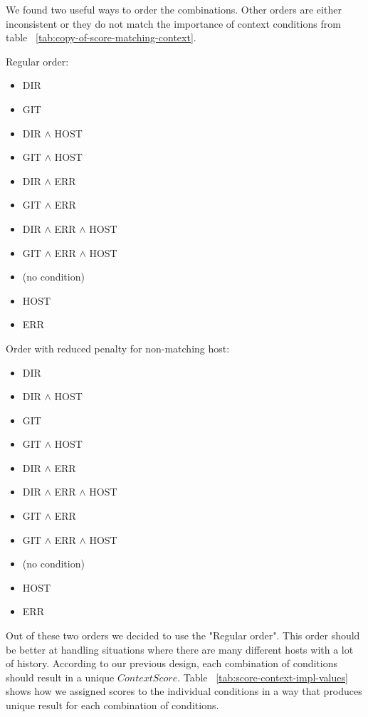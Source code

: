 \documentclass[thesis=M,english]{FITthesis}[2012/10/20]
\let\myRef\ref
\renewcommand\ref{\unskip~\myRef}
\begin{document}
We found two useful ways to order the combinations. Other orders are either inconsistent or they do not match the importance of context conditions from table \ref{tab:copy-of-score-matching-context}. %

\begin{multicols}{2}[]
Regular order:
\begin{itemize}
    \item DIR
    \item GIT
    \item DIR \(\wedge\) HOST
    \item GIT \(\wedge\) HOST
    \item DIR \(\wedge\) ERR
    \item GIT \(\wedge\) ERR
    \item DIR \(\wedge\) ERR \(\wedge\) HOST 
    \item GIT \(\wedge\) ERR \(\wedge\) HOST
    \item (no condition)
    \item HOST
    \item ERR
\end{itemize}

Order with reduced penalty for non-matching host:
\begin{itemize}
    \item DIR
    \item DIR \(\wedge\) HOST
    \item GIT
    \item GIT \(\wedge\) HOST
    \item DIR \(\wedge\) ERR
    \item DIR \(\wedge\) ERR \(\wedge\) HOST
    \item GIT \(\wedge\) ERR
    \item GIT \(\wedge\) ERR \(\wedge\) HOST
    \item (no condition)
    \item HOST
    \item ERR
\end{itemize}
\end{multicols}

Out of these two orders we decided to use the "Regular order". This order should be better at handling situations where there are many different hosts with a lot of history. According to our previous design, each combination of conditions should result in a unique \(ContextScore\). Table \ref{tab:score-context-impl-values} shows how we assigned scores to the individual conditions in a way that produces unique result for each combination of conditions.
\end{document}
